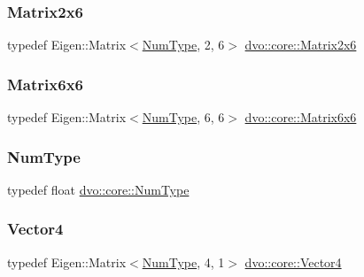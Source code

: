 \mbox{\label{namespacedvo_1_1core_ac6a9bb149a44f85a33be52a701abfac8}} 
\subsubsection{\texorpdfstring{Matrix2x6}{Matrix2x6}}
{\footnotesize\ttfamily typedef Eigen\+::\+Matrix$<$\mbox{\hyperlink{namespacedvo_1_1core_ab9c199d221775a923e2549ad7e15c323}{Num\+Type}}, 2, 6$>$ \mbox{\hyperlink{namespacedvo_1_1core_ac6a9bb149a44f85a33be52a701abfac8}{dvo\+::core\+::\+Matrix2x6}}}

\mbox{\label{namespacedvo_1_1core_a7b76cdc563f01ec2220fd58316004626}} 
\subsubsection{\texorpdfstring{Matrix6x6}{Matrix6x6}}
{\footnotesize\ttfamily typedef Eigen\+::\+Matrix$<$\mbox{\hyperlink{namespacedvo_1_1core_ab9c199d221775a923e2549ad7e15c323}{Num\+Type}}, 6, 6$>$ \mbox{\hyperlink{namespacedvo_1_1core_a7b76cdc563f01ec2220fd58316004626}{dvo\+::core\+::\+Matrix6x6}}}

\mbox{\label{namespacedvo_1_1core_ab9c199d221775a923e2549ad7e15c323}} 
\subsubsection{\texorpdfstring{Num\+Type}{NumType}}
{\footnotesize\ttfamily typedef float \mbox{\hyperlink{namespacedvo_1_1core_ab9c199d221775a923e2549ad7e15c323}{dvo\+::core\+::\+Num\+Type}}}

\mbox{\label{namespacedvo_1_1core_a71fd2291c4d15b2a797ec3a0959d2b6a}} 
\subsubsection{\texorpdfstring{Vector4}{Vector4}}
{\footnotesize\ttfamily typedef Eigen\+::\+Matrix$<$\mbox{\hyperlink{namespacedvo_1_1core_ab9c199d221775a923e2549ad7e15c323}{Num\+Type}}, 4, 1$>$ \mbox{\hyperlink{namespacedvo_1_1core_a71fd2291c4d15b2a797ec3a0959d2b6a}{dvo\+::core\+::\+Vector4}}}

